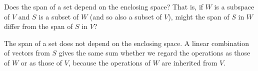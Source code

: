 
\begin{Exercise}[
name={},
title={}, 
difficulty=0,
origin={\cite{JH}}]
Does the span of a set depend on the enclosing space?
    That is, if \( W \) is a subspace of \( V \) and \( S \) is a subset of
    \( W \) (and so also a subset of \( V \)), might the span of \( S \) in
    \( W \) differ from the span of \( S \) in \( V \)?
\end{Exercise}

\begin{Answer}
      The span of a set does not depend on the enclosing space.
      A linear combination of vectors from \( S \) gives the same sum
      whether we regard the operations as those of \( W \) or as those of
      \( V \), because the operations of \( W \) are inherited from \(  V \).  


\end{Answer}
